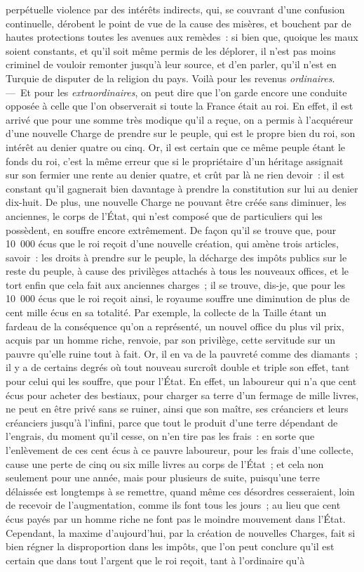 \documentclass[french,twoside]{book} %
\begin{document}
perpétuelle violence par des intérêts indirects, qui, se couvrant d’une confusion continuelle, dérobent le point de vue de la cause des misères, et bouchent par de hautes protections toutes les avenues aux remèdes : si bien que, quoique les maux soient constants, et qu’il soit même permis de les déplorer, il n’est pas moins criminel de vouloir remonter jusqu’à leur source, et d’en parler, qu’il n’est en Turquie de disputer de la religion du pays. Voilà pour les revenus {\itshape ordinaires}. — Et pour les {\itshape extraordinaires}, on peut dire que l’on garde encore une conduite opposée à celle que l’on observerait si toute la France était au roi. En effet, il est arrivé que pour une somme très modique qu’il a reçue, on a permis à l’acquéreur d’une nouvelle Charge de prendre sur le peuple, qui est le propre bien du roi, son intérêt au denier quatre ou cinq. Or, il est certain que ce même peuple étant le fonds du roi, c’est la même erreur que si le propriétaire d’un héritage assignait sur son fermier une rente au denier quatre, et crût par là ne rien devoir : il est constant qu’il gagnerait bien davantage à prendre la constitution sur lui au denier dix-huit. De plus, une nouvelle Charge ne pouvant être créée sans diminuer, les anciennes, le corps de l’État, qui n’est composé que de particuliers qui les possèdent, en souffre encore extrêmement. De façon qu’il se trouve que, pour 10 000 écus que le roi reçoit d’une nouvelle création, qui amène trois articles, savoir : les droits à prendre sur le peuple, la décharge des impôts publics sur le reste du peuple, à cause des privilèges attachés à tous les nouveaux offices, et le tort enfin que cela fait aux anciennes charges ; il se trouve, dis-je, que pour les 10 000 écus que le roi reçoit ainsi, le royaume souffre une diminution de plus de cent mille écus en sa totalité. Par exemple, la collecte de la Taille étant un fardeau de la conséquence qu’on a représenté, un nouvel office du plus vil prix, acquis par un homme riche, renvoie, par son privilège, cette servitude sur un pauvre qu’elle ruine tout à fait. Or, il en va de la pauvreté comme des diamants ; il y a de certains degrés où tout nouveau surcroît double et triple son effet, tant pour celui qui les souffre, que pour l’État. En effet, un laboureur qui n’a que cent écus pour acheter des bestiaux, pour charger sa terre d’un fermage de mille livres, ne peut en être privé sans se ruiner, ainsi que son maître, ses créanciers et leurs créanciers jusqu’à l’infini, parce que tout le produit d’une terre dépendant de l’engrais, du moment qu’il cesse, on n’en tire pas les frais : en sorte que l’enlèvement de ces cent écus à ce pauvre laboureur, pour les frais d’une collecte, cause une perte de cinq ou six mille livres au corps de l’État ; et cela non seulement pour une année, mais pour plusieurs de suite, puisqu’une terre délaissée est longtemps à se remettre, quand même ces désordres cesseraient, loin de recevoir de l’augmentation, comme ils font tous les jours ; au lieu que cent écus payés par un homme riche ne font pas le moindre mouvement dans l’État. Cependant, la maxime d’aujourd’hui, par la création de nouvelles Charges, fait si bien régner la disproportion dans les impôts, que l’on peut conclure qu’il est certain que dans tout l’argent que le roi reçoit, tant à l’ordinaire qu’à 
\end{document}
